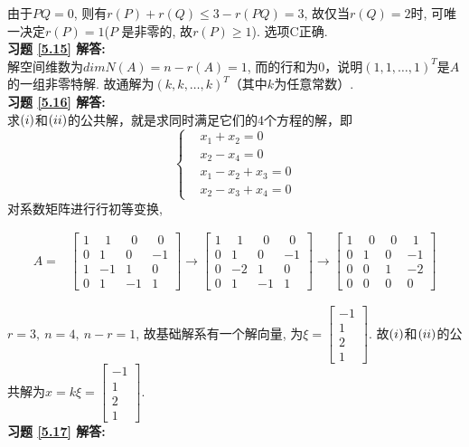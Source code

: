 由于$PQ=0$, 则有$r(P)+r(Q)≤3-r(PQ)=3$, 故仅当$r(Q)=2$时, 可唯一决定$r(P)=1$($P$ 是非零的, 故$r(P)≥1$).  选项C正确.\\
\textbf{习题 \ref{5.15} 解答:}\\
解空间维数为$dimN(A)=n-r(A)=1$, 而的行和为$0$，说明$(1,1,\dots,1)^T$是$A$ 的一组非零特解. 故通解为$(k,k,\dots,k)^T$（其中$k$为任意常数）.\\
\textbf{习题 \ref{5.16} 解答:}\\
求$(\romannumeral 1)$和$(\romannumeral 2)$的公共解，就是求同时满足它们的4个方程的解，即
\begin{displaymath}\left\{\begin{aligned}&x_1+x_2         =0\\&   x_2     -x_4=0\\& x_1-x_2+x_3     =0\\&    x_2-x_3+x_4=0\end{aligned}\right.\end{displaymath}
对系数矩阵进行行初等变换,

\begin{displaymath}
\begin{aligned}
A=&\begin{bmatrix}1&\ \ 1&\ \ 0&\ \ 0\\0&1&0&-1\\1&-1&1&0\\0&1&-1&1 \end{bmatrix}\rightarrow
\begin{bmatrix}1&\ \ 1&\ \ 0&\ \ 0\\0&1&0&-1\\0&-2&1&0\\0&1&-1&1 \end{bmatrix}\rightarrow
\begin{bmatrix} 1&\ \ 0&\ \ 0&\ \ 1\\0&1&0&-1\\0&0&1&-2\\0&0&0&0\end{bmatrix}
\end{aligned} \end{displaymath}

$r=3,\ n=4,\ n-r=1$, 故基础解系有一个解向量, 为$\xi=\begin{bmatrix}-1\\1\\2\\1\end{bmatrix}$. 故$(\romannumeral 1)$和$(\romannumeral 2)$的公共解为$x=k\xi=\begin{bmatrix}-1\\1\\2\\1\end{bmatrix}$.\\
\textbf{习题 \ref{5.17} 解答:}\\

